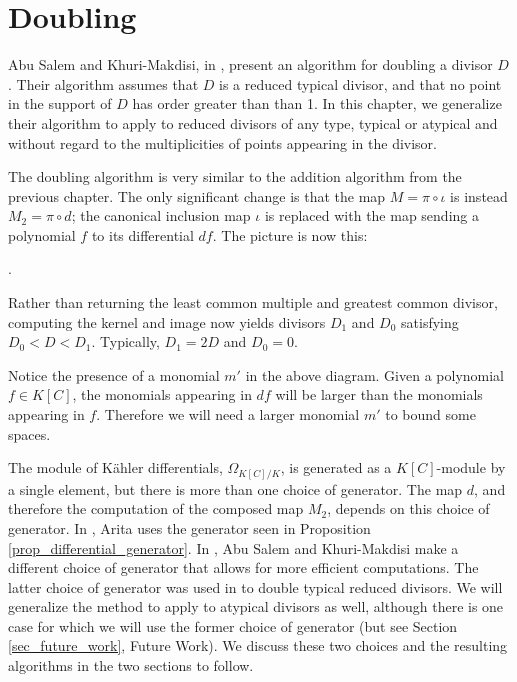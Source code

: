
\section{Doubling}
\label{chap_doubling}

Abu Salem and Khuri-Makdisi, in \cite{salem07}, present an algorithm for doubling a divisor $D$.
Their algorithm assumes that $D$ is a reduced typical divisor,
and that no point in the support of $D$ has order greater than than 1.
In this chapter, we generalize their algorithm to apply to reduced divisors of any type,
typical or atypical and without regard to the multiplicities of points appearing in the divisor.

The doubling algorithm is very similar to the addition algorithm from the previous chapter.
The only significant change is that the map $M = \pi \circ \iota$ is instead $M_2 = \pi \circ d$;
the canonical inclusion map $\iota$ is replaced with the map sending a polynomial $f$ to its differential $df$.
The picture is now this:
\begin{center}
  .
\end{center}
Rather than returning the least common multiple and greatest common divisor,
computing the kernel and image now yields divisors $D_1$ and $D_0$ satisfying $D_0 < D < D_1$.
Typically, $D_1 = 2D$ and $D_0 = 0$.

Notice the presence of a monomial $m'$ in the above diagram.
Given a polynomial $f \in K[C]$, the monomials appearing in $df$ will be larger than the monomials appearing in $f$.
Therefore we will need a larger monomial $m'$ to bound some spaces.

The module of K\"ahler differentials, $\Omega_{K[C]/K}$, is generated as a $K[C]$-module by a single element,
but there is more than one choice of generator.
The map $d$, and therefore the computation of the composed map $M_2$, depends on this choice of generator.
In \cite{arita05-2}, Arita uses the generator seen in Proposition \ref{prop_differential_generator}.
In \cite{salem07}, Abu Salem and Khuri-Makdisi make a different choice of generator
that allows for more efficient computations.
The latter choice of generator was used in \cite{salem07} to double typical reduced divisors.
We will generalize the method to apply to atypical divisors as well,
although there is one case for which we will use the former choice of generator
(but see Section \ref{sec_future_work}, Future Work).
We discuss these two choices and the resulting algorithms in the two sections to follow.



